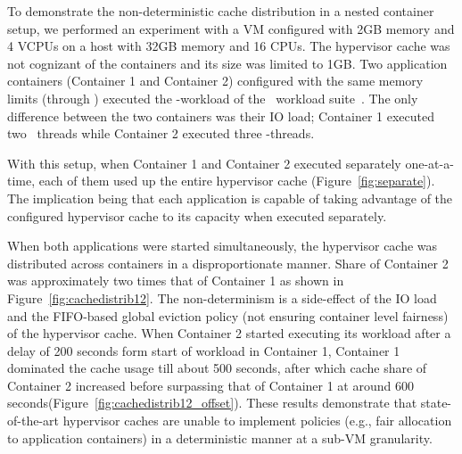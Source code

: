To demonstrate the non-deterministic cache distribution in a nested 
container setup, we performed an experiment with a VM configured 
with 2GB memory and 4 VCPUs on a host with 32GB memory and 16 CPUs.
%
The hypervisor cache 
was not cognizant of the containers and its size was limited to 1GB.
%
%
Two application containers (Container 1 and Container 2) configured with 
the same memory limits (through \cgroup) executed the \web-workload of the 
\file~workload suite~\cite{filebench}.
%
The only difference between the two containers was their IO load; 
Container 1 executed two
\web~threads while Container 2 executed three \web-threads.
%

With this setup, when Container 1 and Container 2 executed separately one-at-a-time, 
each of them used up the entire hypervisor cache (Figure~\ref{fig:separate}).
%
The implication being that each application is capable of taking advantage 
of the configured hypervisor cache to its capacity when executed separately.
%
%

When both applications were started simultaneously,
the hypervisor
cache was distributed across containers in a disproportionate manner.
%
Share of Container 2 was approximately two times that of
Container 1 as shown in Figure~\ref{fig:cachedistrib12}.
%
The non-determinism is a side-effect of the IO load and
the FIFO-based global eviction policy (not ensuring container level fairness) 
of the hypervisor cache.
%
When Container 2 started executing its  workload after a delay of 200 seconds 
form start of workload in Container 1,
%
Container 1 dominated the cache usage till about 500 seconds, after which
cache share of Container 2 increased before surpassing that of 
Container 1 at around 600 seconds(Figure~\ref{fig:cachedistrib12_offset}).
%
%
These results demonstrate that state-of-the-art hypervisor caches are unable to
implement policies (e.g., fair allocation to application containers) in a 
deterministic manner at a sub-VM granularity.
%

